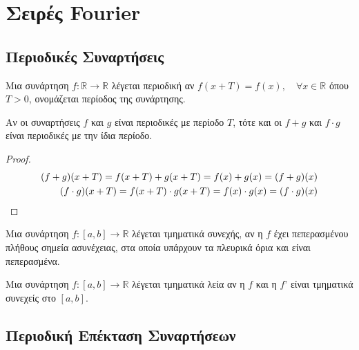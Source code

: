 



\pagestyle{vangelis}




\chapter{Σειρές Fourier}

\section{Περιοδικές Συναρτήσεις}

\vspace{\baselineskip}

\begin{dfn}
  Μια συνάρτηση $ f \colon \mathbb{R} \to \mathbb{R} $ λέγεται 
  \textcolor{Col1}{περιοδική} αν 
  $
  f(x+T)=f(x),\quad \forall x \in \mathbb{R} 
  $ 
  όπου $ T>0 $, ονομάζεται \textcolor{Col1}{περίοδος} της συνάρτησης.
\end{dfn}

\begin{prop}
  Αν οι συναρτήσεις $ f $ και $g$ είναι περιοδικές με περίοδο $T$, τότε και οι 
  $ f+g $ και $ f\cdot g $ είναι περιοδικές με την ίδια περίοδο.
\end{prop}
\begin{proof}
  \begin{align*}
    (f+g)(x+T) = f(x+T)+g(x+T)=f(x)+g(x)=(f+g)(x) \\
    (f\cdot g)(x+T) = f(x+T)\cdot g(x+T)=f(x)\cdot g(x)=(f\cdot g)(x) \hfill
  \end{align*}
\end{proof}

\begin{dfn}
  Μια συνάρτηση $ f \colon [a,b] \to \mathbb{R} $ λέγεται 
  \textcolor{Col1}{τμηματικά συνεχής}, αν η  $f$ έχει πεπερασμένου πλήθους 
  σημεία ασυνέχειας, στα οποία υπάρχουν τα πλευρικά όρια και είναι πεπερασμένα.
\end{dfn}

\begin{dfn}
  Μια συνάρτηση  $ f \colon [a,b] \to \mathbb{R} $  λέγεται  
  \textcolor{Col1}{τμηματικά λεία} αν η $f$ και η $f$' είναι τμηματικά συνεχείς 
  στο $ [a,b] $.     
\end{dfn}


\section{Περιοδική Επέκταση Συναρτήσεων}

